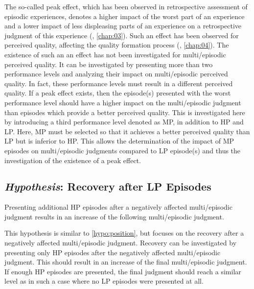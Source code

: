 The so-called peak effect, which has been observed in retrospective assessment of episodic experiences, denotes a higher impact of the worst part of an experience and a lower impact of less displeasing parts of an experience on a retrospective judgment of this experience (\cf, \autoref{chap:03}).
Such an effect has been observed for perceived quality, affecting the quality formation process (\cf, \autoref{chap:04}).
The existence of such an an effect has not been investigated for multi\-/episodic perceived quality.
It can be investigated by presenting more than two performance levels and analyzing their impact on multi\-/episodic perceived quality.
In fact, these performance levels must result in a different perceived quality.
If a peak effect exists, then the episode(s) presented with the worst performance level should have a higher impact on the multi\-/episodic judgment than episodes which provide a better perceived quality.
This is investigated here by introducing a third performance level denoted as \ac{MP}, in addition to \ac{HP} and \ac{LP}.
Here, \ac{MP} must be selected so that it achieves a better perceived quality than \ac{LP} but is inferior to \ac{HP}.
This allows the determination of the impact of \ac{MP} episodes on multi\-/episodic judgments compared to \ac{LP} episode(s) and thus the investigation of the existence of a peak effect.



\subsection[H5: Recovery after \acs{LP} Episodes]{\emph{Hypothesis}: Recovery after \acs{LP} Episodes}
\begin{hypothesis}\label{hypo:recovery}
Presenting additional \ac{HP} episodes after a negatively affected multi\-/episodic judgment results in an increase of the following multi\-/episodic judgment.
\end{hypothesis}

This hypothesis is similar to \autoref{hypo:position}, but focuses on the recovery after a negatively affected multi\-/episodic judgment.
Recovery can be investigated by presenting only \ac{HP} episodes after the negatively affected multi\-/episodic judgment.
This should result in an increase of the final multi\-/episodic judgment.
If enough \ac{HP} episodes are presented, the final judgment should reach a similar level as in such a case where no \ac{LP} episodes were presented at all.

